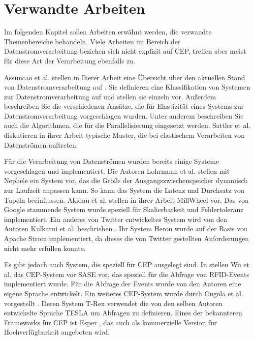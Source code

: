 \chapter{Verwandte Arbeiten}
Im folgenden Kapitel sollen Arbeiten erwähnt werden, die verwandte Themenbereiche behandeln.
Viele Arbeiten im Bereich der Datenstromverarbeitung beziehen sich nicht explizit auf CEP, treffen aber meist für diese Art der Verarbeitung ebenfalls zu.

Assuncao et al. stellen in Iherer Arbeit eine Übersicht über den aktuellen Stand von Datenstromverarbeitung auf \cite{de_assuncao_distributed_2017}.
Sie definieren eine Klassifikation von Systemen zur Datenstromverarbeitung auf und stellen sie einzeln vor.
Außerdem beschreiben Sie die verschiedenen Ansätze, die für Elastizität eines Systems zur Datenstromverarbeitung vorgeschlagen wurden.
Unter anderem beschreiben Sie auch die Algorithmen, die für die Parallelisierung eingesetzt werden.
Sattler et al. \cite{sattler_towards_2013} diskutieren in ihrer Arbeit typische Muster, die bei elastischem Verarbeiten von Datenströmen auftreten.

Für die Verarbeitung von Datenströmen wurden bereits einige Systeme vorgeschlagen und implementiert.
Die Autoren Lohrmann et al. \cite{lohrmann_nephele_2014} stellen mit Nephele ein System vor, das die Größe der Ausgangszwischenspeicher dynamisch zur Laufzeit anpassen kann.
So kann das System die Latenz und Durchsatz von Tupeln beeinflussen.
Akidau et al. \cite{akidau_millwheel:_2013} stellen in ihrer Arbeit MillWheel vor.
Das von Google stammende System wurde speziell für Skalierbarkeit und Fehlertoleranz implementiert.
Ein anderes von Twitter entwickeltes System wird von den Autoren Kulkarni et al. beschrieben \cite{kulkarni_twitter_2015}.
Ihr System Heron wurde auf der Basis von Apache Strom implementiert, da dieses die von Twitter gestellten Anforderungen nicht mehr erfüllen konnte.

Es gibt jedoch auch System, die speziell für CEP ausgelegt sind.
In \cite{wu_high-performance_2006} stellen Wu et al. das CEP-System vor SASE vor, das speziell für die Abfrage von RFID-Events implementiert wurde.
Für die Abfrage der Events wurde von den Autoren eine eigene Sprache entwickelt.
Ein weiteres CEP-System wurde durch Cugola et al. vorgestellt \cite{cugola_complex_2012}.
Deren System T-Rex verwendet die von den selben Autoren entwickelte Sprache TESLA \cite{cugola_tesla:_2010} um Abfragen zu definieren. 
Eines der bekannteren Frameworks für CEP ist Esper \cite{noauthor_home_nodate}, das auch als kommerzielle Version für Hochverfügbarkeit angeboten wird.

